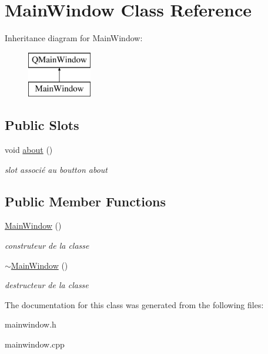 \hypertarget{classMainWindow}{\section{Main\-Window Class Reference}
\label{classMainWindow}
}
Inheritance diagram for Main\-Window\-:\begin{figure}[H]
\begin{center}
\leavevmode
\includegraphics[height=2.000000cm]{classMainWindow}
\end{center}
\end{figure}
\subsection*{Public Slots}
\begin{DoxyCompactItemize}
\item 
\hypertarget{classMainWindow_a7be6a5d98970ac1a6296c6f9aee1e9bb}{void \hyperlink{classMainWindow_a7be6a5d98970ac1a6296c6f9aee1e9bb}{about} ()}\label{classMainWindow_a7be6a5d98970ac1a6296c6f9aee1e9bb}

\begin{DoxyCompactList}\small\item\em slot associé au boutton about \end{DoxyCompactList}\end{DoxyCompactItemize}
\subsection*{Public Member Functions}
\begin{DoxyCompactItemize}
\item 
\hypertarget{classMainWindow_a34c4b4207b46d11a4100c9b19f0e81bb}{\hyperlink{classMainWindow_a34c4b4207b46d11a4100c9b19f0e81bb}{Main\-Window} ()}\label{classMainWindow_a34c4b4207b46d11a4100c9b19f0e81bb}

\begin{DoxyCompactList}\small\item\em construteur de la classe \end{DoxyCompactList}\item 
\hypertarget{classMainWindow_ae98d00a93bc118200eeef9f9bba1dba7}{\hyperlink{classMainWindow_ae98d00a93bc118200eeef9f9bba1dba7}{$\sim$\-Main\-Window} ()}\label{classMainWindow_ae98d00a93bc118200eeef9f9bba1dba7}

\begin{DoxyCompactList}\small\item\em destructeur de la classe \end{DoxyCompactList}\end{DoxyCompactItemize}


The documentation for this class was generated from the following files\-:\begin{DoxyCompactItemize}
\item 
mainwindow.\-h\item 
mainwindow.\-cpp\end{DoxyCompactItemize}
